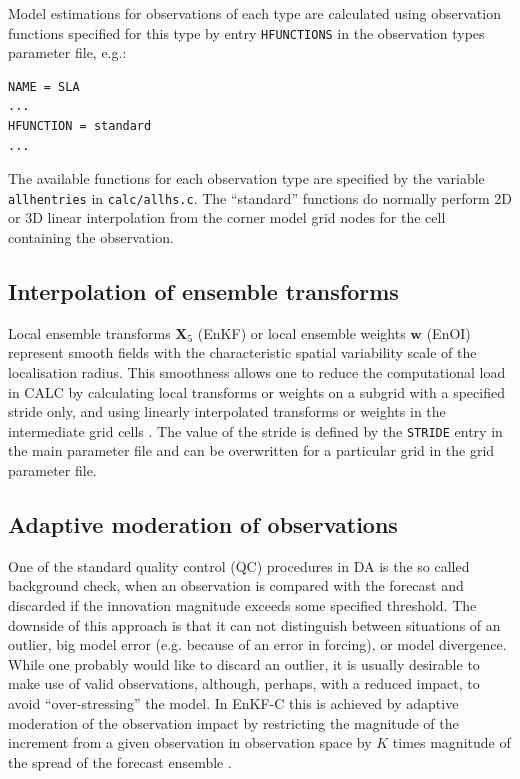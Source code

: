 \documentclass[11pt]{report}
\newcommand{\mb} {\mathbf}
\begin{document}
Model estimations for observations of each type are calculated using observation functions specified for this type by entry \verb|HFUNCTIONS| in the observation types parameter file, e.g.:
\begin{Verbatim}[frame=single,fontsize=\footnotesize]
NAME = SLA
...
HFUNCTION = standard
...
\end{Verbatim}
The available functions for each observation type are specified by the variable \verb|allhentries| in \verb|calc/allhs.c|.
The ``standard'' functions do normally perform 2D or 3D linear interpolation from the corner model grid nodes for the cell containing the observation.

\subsection{Interpolation of ensemble transforms}

Local ensemble transforms $\mb X_5$ (EnKF) or local ensemble weights $\mb w$ (EnOI) represent smooth fields with the characteristic spatial variability scale of the localisation radius.
This smoothness allows one to reduce the computational load in CALC by calculating local transforms or weights on a subgrid with a specified stride only, and using linearly interpolated transforms or weights in the intermediate grid cells \citep{yan09a}.
The value of the stride is defined by the \verb|STRIDE| entry in the main parameter file and can be overwritten for a particular grid in the grid parameter file.

\subsection{Adaptive moderation of observations}

One of the standard quality control (QC) procedures in DA is the so called background check, when an observation is compared with the forecast and discarded if the innovation magnitude exceeds some specified threshold.
The downside of this approach is that it can not distinguish between situations of an outlier, big model error (e.g. because of an error in forcing), or model divergence.
While one probably would like to discard an outlier, it is usually desirable to make use of valid observations, although, perhaps, with a reduced impact, to avoid ``over-stressing'' the model.
In EnKF-C this is achieved by adaptive moderation of the observation impact by restricting the magnitude of the increment from a given observation in observation space by $K$ times magnitude of the spread of the forecast ensemble \citep{sak17a}.
\end{document}
